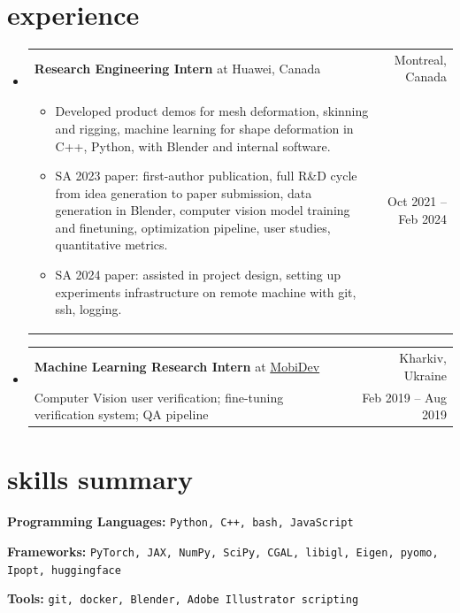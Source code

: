 \documentclass[a4paper,20pt]{article}
\makeatletter
\newcommand{\experienceSmallheading}[4]{
	\vspace{-3pt}
	\item
	\begin{tabular*}{0.97\textwidth}[t]{@{}p{0.75\textwidth}@{\extracolsep{\fill}}r@{}}
		#1 & #2\\ 
		#3 & #4 \\
	\end{tabular*}\vspace{-5pt}
}
\renewcommand{\labelitemi}{$\triangleright$}
\newcommand{\resumeSubHeadingListStart}{\begin{itemize}[leftmargin=*]}
\newcommand{\resumeSubHeadingListEnd}{\end{itemize}}
\makeatother
\begin{document}
	\section{experience}
	\resumeSubHeadingListStart
	\vspace{1mm}
	\experienceSmallheading
	{\textbf{Research Engineering Intern} at Huawei, Canada}
	{Montreal, Canada}
	{
		\vspace{-2mm}
		\begin{itemize}[leftmargin=*, topsep=0pt, partopsep=0pt, itemsep=0pt, parsep=0pt]
			\item Developed product demos for mesh deformation, skinning and rigging, machine learning for shape deformation in C++, Python, with Blender and internal software.
            \item SA 2023 paper: first-author publication, full R\&D cycle from idea generation to paper submission, data generation in Blender, computer vision model training and finetuning, optimization pipeline, user studies, quantitative metrics.
			\item SA 2024 paper: assisted in  project design, setting up experiments infrastructure on remote machine with git, ssh, logging.
        \end{itemize}
		\vspace{-4mm}
	}
	{Oct 2021 -- Feb 2024}

	\experienceSmallheading
	{\textbf{Machine Learning Research Intern} at \href{https://mobidev.biz/}{MobiDev}}
	{Kharkiv, Ukraine}
	{Computer Vision user verification; fine-tuning verification system; QA pipeline}
	{Feb 2019 -- Aug 2019}
	
	\resumeSubHeadingListEnd
	\vspace{-1mm}

	\section{skills summary}
	\textbf{Programming Languages: }{\texttt{Python, C++, bash, JavaScript}}
	
	\vspace{1pt}
	
	\textbf{Frameworks: }{\texttt{PyTorch, JAX, NumPy, SciPy, CGAL, libigl, Eigen, pyomo, Ipopt, huggingface}}
	
	\vspace{1pt}
	
	\textbf{Tools: }{\texttt{git, docker, Blender, Adobe Illustrator scripting}}
	
\end{document}
